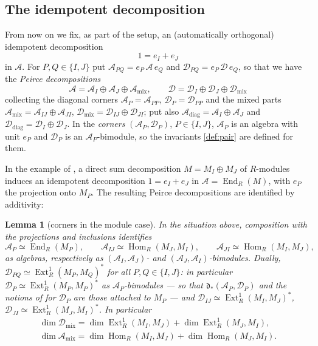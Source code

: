 \documentclass[12pt]{article}
\def\xspace{ }%
\newtheorem{lemma}[lemma]{Lemma}
\theoremstyle{definition}
\newcommand{\prigity}{pseudorigidity\xspace}
\newcommand{\mix}{\mathrm{mix}}   %
\newcommand{\diag}{\mathrm{diag}} %
\newcommand{\Ext}{\operatorname{Ext}}
\newcommand{\Hom}{\operatorname{Hom}}
\newcommand{\End}{\operatorname{End}}
\newcommand{\alg}{\mathcal{A}}   %
\newcommand{\bmdl}{\mathcal{D}}   %
\newcommand{\dfr}{\mathfrak{d}}  %
\newcommand{\rsub}{\sharp}       %
\newcommand{\psub}{\flat}        %
\begin{document}
\subsection{The idempotent decomposition}\label{ssec:split}

From now on we fix, as part of the setup, an (automatically orthogonal) idempotent decomposition
\[
   1 = e_I + e_J
\]
in $\alg$. For $P, Q \in \{I,J\}$ put $\alg_{PQ} =
e_P\,\alg\,e_{Q}$ and $\bmdl_{PQ} = e_P\,\bmdl\,e_{Q}$, so that we have the
\emph{Peirce decompositions}
\begin{equation}\label{eq:decomp}
   \alg = \alg_I \oplus \alg_J \oplus \alg_{\mix},
   \qquad
   \bmdl = \bmdl_I \oplus \bmdl_J \oplus \bmdl_{\mix}
\end{equation}
collecting the diagonal corners $\alg_P = \alg_{PP}$, $\bmdl_P = \bmdl_{PP}$
and the mixed parts $\alg_{\mix} = \alg_{IJ}\oplus\alg_{JI}$,
$\bmdl_{\mix} = \bmdl_{IJ}\oplus \bmdl_{JI}$; put also
$\alg_{\diag} = \alg_I\oplus\alg_J$ and $\bmdl_{\diag} =
\bmdl_I \oplus \bmdl_J$. In the \emph{corners} $(\alg_P, \bmdl_P)$, $P \in
\{I,J\}$, $\alg_P$ is an algebra with unit $e_P$ and $\bmdl_P$ is an
$\alg_P$-bimodule, so the invariants \eqref{def:pair} are defined for them.

In the example of , a direct sum decomposition $M = M_I
\oplus M_J$ of $R$-modules induces an idempotent decomposition
$1 = e_I + e_J$ in $\alg = \End_R(M)$, with $e_P$ the projection onto
$M_P$. The resulting Peirce decompositions are identified by additivity:

\begin{lemma}[corners in the module case]\label{lem:corners}
In the situation above, composition with the projections and inclusions
identifies
\[
   \alg_P \simeq \End_R(M_P), \qquad
   \alg_{IJ} \simeq \Hom_R(M_J,M_I), \qquad
   \alg_{JI} \simeq \Hom_R(M_I,M_J),
\]
as algebras, respectively as $(\alg_I,\alg_J)$- and
$(\alg_J,\alg_I)$-bimodules. Dually, $\bmdl_{PQ} \simeq \Ext^1_R(M_P,M_Q)^*$
for all $P, Q \in \{I,J\}$: in particular $\bmdl_P \simeq
\Ext^1_R(M_P,M_P)^*$ as $\alg_P$-bimodules --- so that
$\dfr_\ast(\alg_P,\bmdl_P)$ and the notions of  for $\bmdl_P$ are
those attached to $M_P$ --- and $\bmdl_{IJ} \simeq \Ext^1_R(M_I,M_J)^*$,
$\bmdl_{JI} \simeq \Ext^1_R(M_J,M_I)^*$. In particular
\begin{gather*}
   \dim\bmdl_{\mix} = \dim\Ext^1_R(M_I,M_J) +
   \dim\Ext^1_R(M_J,M_I),\\
   \dim\alg_{\mix} = \dim\Hom_R(M_I,M_J) + \dim\Hom_R(M_J,M_I) .
\end{gather*}
\end{lemma}
\end{document}
